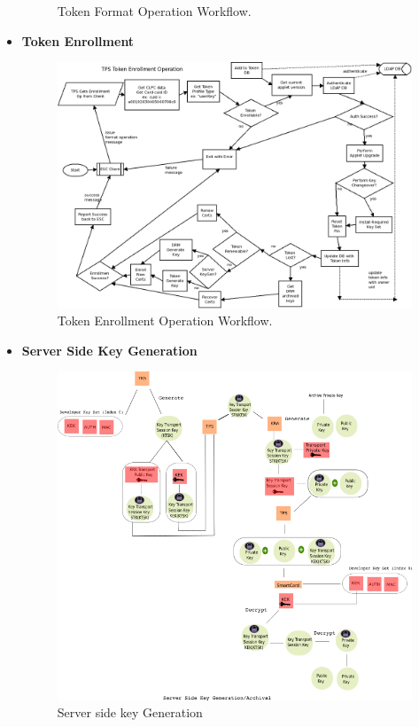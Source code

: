 \documentclass[12pt]{report}
\begin{document}
\begin{itemize}
\begin{figure}[H]
                \caption{Token Format Operation Workflow. ~\cite{RedHat:securechannel}}
            \end{figure}
        \item \textbf{Token Enrollment}
            \begin{figure}[H]
                \centering
                \includegraphics[width=120mm]{Images/TPS_Enrollment.png}
                \caption{Token Enrollment Operation Workflow.~\cite{RedHat:securechannel}}
            \end{figure}
        \item \textbf{Server Side Key Generation}
            \begin{figure}[H]
                \centering
                \includegraphics[width=120mm]{Images/tks-tps-drm-esc-enrollment3.png}
                \caption{Server side key Generation}
            \end{figure}
    \end{itemize}
\end{document}
